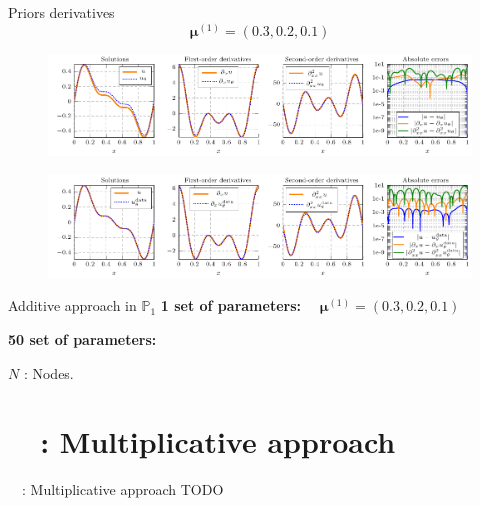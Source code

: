 \begin{frame}{Priors derivatives}
	\vspace{-10pt}
	$$\bm{\mu}^{(1)}=(0.3,0.2,0.1)$$
	\begin{figure}[ht!]
		\centering
		\includegraphics[width=\linewidth]{images/appendix/datavspinns/standalone_solutions_and_errors_PINN.pdf}
	\end{figure}
	
	\begin{figure}[ht!]
		\centering
		\includegraphics[width=\linewidth]{images/appendix/datavspinns/standalone_solutions_and_errors_NN.pdf}
	\end{figure}
\end{frame}

\begin{frame}{Additive approach in $\mathbb{P}_1$}
	\vspace{-2pt}
	\textbf{1 set of parameters:} $\quad \bm{\mu}^{(1)}=(0.3,0.2,0.1)$
	
	\begin{table}[H]
		\centering
	\end{table}

	\vspace{6pt}
	\textbf{50 set of parameters:}

	\begin{table}[H]
		\centering
	\end{table}

	\footnotesize
	$N$ : Nodes.
\end{frame}

\addtocounter{appendixframenumber}{1}

\section{\appendixname~\theappendixframenumber~: Multiplicative approach}

\begin{frame}{\appendixname~\theappendixframenumber~: Multiplicative approach}
	TODO
\end{frame}
\addtocounter{appendixframenumber}{1}